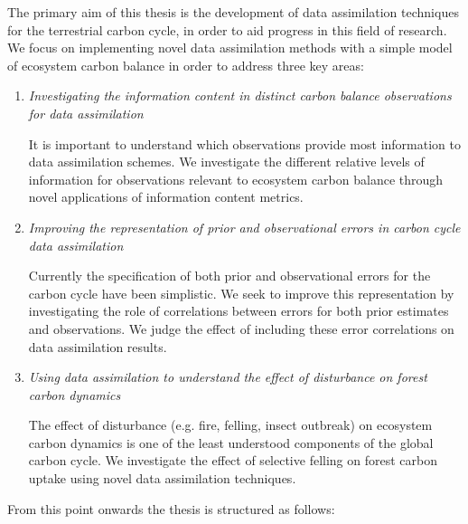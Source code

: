 
The primary aim of this thesis is the development of data assimilation techniques for the terrestrial carbon cycle, in order to aid progress in this field of research. We focus on implementing novel data assimilation methods with a simple model of ecosystem carbon balance in order to address three key areas:

\begin{enumerate}
\item \textit{Investigating the information content in distinct carbon balance observations for data assimilation}

It is important to understand which observations provide most information to data assimilation schemes. We investigate the different relative levels of information for observations relevant to ecosystem carbon balance through novel applications of information content metrics.

\item \textit{Improving the representation of prior and observational errors in carbon cycle data assimilation}

Currently the specification of both prior and observational errors for the carbon cycle have been simplistic. We seek to improve this representation by investigating the role of correlations between errors for both prior estimates and observations. We judge the effect of including these error correlations on data assimilation results.
  
\item \textit{Using data assimilation to understand the effect of disturbance on forest carbon dynamics}

The effect of disturbance (e.g. fire, felling, insect outbreak) on ecosystem carbon dynamics is one of the least understood components of the global carbon cycle. We investigate the effect of selective felling on forest carbon uptake using novel data assimilation techniques.
\end{enumerate}

From this point onwards the thesis is structured as follows:

